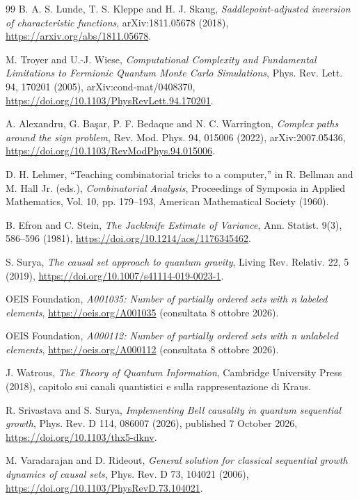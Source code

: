 \documentclass[11pt,a4paper]{article}
\begin{document}
\begin{thebibliography}{99}
B. A. S. Lunde, T. S. Kleppe and H. J. Skaug,
\textit{Saddlepoint-adjusted inversion of characteristic functions},
arXiv:1811.05678 (2018),
\url{https://arxiv.org/abs/1811.05678}.

M. Troyer and U.-J. Wiese,
\textit{Computational Complexity and Fundamental Limitations to Fermionic Quantum Monte Carlo Simulations},
Phys. Rev. Lett. 94, 170201 (2005),
arXiv:cond-mat/0408370,
\url{https://doi.org/10.1103/PhysRevLett.94.170201}.

A. Alexandru, G. Ba\c{s}ar, P. F. Bedaque and N. C. Warrington,
\textit{Complex paths around the sign problem},
Rev. Mod. Phys. 94, 015006 (2022),
arXiv:2007.05436,
\url{https://doi.org/10.1103/RevModPhys.94.015006}.

D. H. Lehmer,
``Teaching combinatorial tricks to a computer,''
in R. Bellman and M. Hall Jr. (eds.), \emph{Combinatorial Analysis}, Proceedings of Symposia in Applied Mathematics, Vol. 10, pp. 179--193, American Mathematical Society (1960).

B. Efron and C. Stein,
\textit{The Jackknife Estimate of Variance},
Ann. Statist. 9(3), 586--596 (1981),
\url{https://doi.org/10.1214/aos/1176345462}.

S. Surya, \textit{The causal set approach to quantum gravity},
Living Rev. Relativ. 22, 5 (2019),
\url{https://doi.org/10.1007/s41114-019-0023-1}.


OEIS Foundation, \textit{A001035: Number of partially ordered sets with n labeled elements},
\url{https://oeis.org/A001035} (consultata 8 ottobre 2026).

OEIS Foundation, \textit{A000112: Number of partially ordered sets with n unlabeled elements},
\url{https://oeis.org/A000112} (consultata 8 ottobre 2026).

J. Watrous, \textit{The Theory of Quantum Information}, Cambridge University Press (2018), capitolo sui canali quantistici e sulla rappresentazione di Kraus.

R. Srivastava and S. Surya,
\textit{Implementing Bell causality in quantum sequential growth},
Phys. Rev. D 114, 086007 (2026), published 7 October 2026,
\url{https://doi.org/10.1103/thx5-dknv}.


M. Varadarajan and D. Rideout,
\textit{General solution for classical sequential growth dynamics of causal sets},
Phys. Rev. D 73, 104021 (2006),
\url{https://doi.org/10.1103/PhysRevD.73.104021}.



\end{thebibliography}
\end{document}
